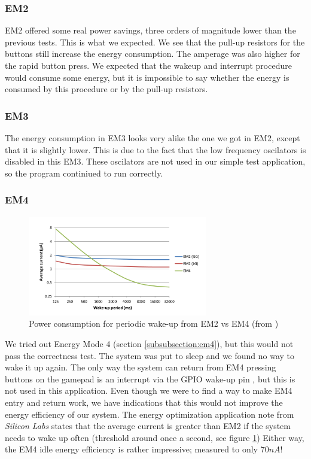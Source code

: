 		\subsubsection{EM2}
		EM2 offered some real power savings, three orders of magnitude lower than the previous tests. This is what we expected. We see that the pull-up resistors for the buttons still increase the energy consumption. The amperage was also higher for the rapid button press. We expected that the wakeup and interrupt procedure would consume some energy, but it is impossible to say whether the energy is consumed by this procedure or by the pull-up resistors.

		\subsubsection{EM3}
		The energy consumption in EM3 looks very alike the one we got in EM2, except that it is slightly lower. This is due to the fact that the low frequency oscilators is disabled in this EM3. These oscilators are not used in our simple test application, so the program continiued to run correctly.
		\subsubsection{EM4}
		\begin{figure}[t]
			\centerline{
				\includegraphics[width=0.7\textwidth]{img/em2vsem4.png}
			}
			\caption{Power consumption for periodic wake-up from EM2 vs EM4 (from \cite[p. 9]{energy_optimization_application_note})}
			\label{fig:em2vsem4}
			
		\end{figure}
		We tried out Energy Mode 4 (section \ref{subsubsection:em4}), but this would not pass the correctness test. The system was put to sleep and we found no way to wake it up again. The only way the system can return from EM4 pressing buttons on the gamepad is an interrupt via the GPIO wake-up pin \cite[p. 8]{reference_manual}, but this is not used in this application. Even though we were to find a way to make EM4 entry and return work, we have indications that this would not improve the energy efficiency of our system. The energy optimization application note from \emph{Silicon Labs} states that the average current is greater than EM2 if the system needs to wake up often (threshold around once a second, see figure \ref{fig:em2vsem4})  Either way, the EM4 idle energy efficiency is rather impressive; measured to only $70nA$!

